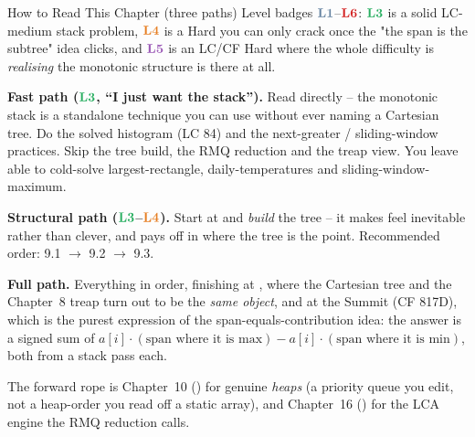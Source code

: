 \begin{chaptertheorybox}{How to Read This Chapter (three paths)}
Level badges $\lv1$--$\lv6$: $\lv3$ is a solid LC-medium stack problem, $\lv4$ is a Hard you can only
crack once the "the span is the subtree" idea clicks, and $\lv5$ is an LC/CF Hard where the whole
difficulty is \emph{realising} the monotonic structure is there at all.

\textbf{Fast path ($\lv3$, ``I just want the stack'').} Read  directly -- the
monotonic stack is a standalone technique you can use without ever naming a Cartesian tree. Do the
solved histogram (LC 84) and the next-greater / sliding-window practices. Skip the tree build, the
RMQ reduction and the treap view. You leave able to cold-solve largest-rectangle, daily-temperatures
and sliding-window-maximum.

\textbf{Structural path ($\lv3$--$\lv4$).} Start at  and \emph{build} the tree
-- it makes  feel inevitable rather than clever, and pays off in
 where the tree is the point. Recommended order: 9.1 $\to$ 9.2 $\to$ 9.3.

\textbf{Full path.} Everything in order, finishing at , where the Cartesian tree
and the Chapter~8 treap turn out to be the \emph{same object}, and at the Summit (CF 817D), which is
the purest expression of the span-equals-contribution idea: the answer is a signed sum of
$a[i]\cdot(\text{span where it is max}) - a[i]\cdot(\text{span where it is min})$, both from a stack
pass each.

The forward rope is Chapter~10 () for genuine \emph{heaps} (a priority queue you edit, not
a heap-order you read off a static array), and Chapter~16 () for the LCA engine the RMQ
reduction calls.
\end{chaptertheorybox}


